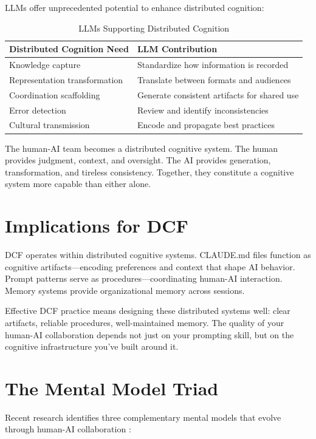 LLMs offer unprecedented potential to enhance distributed cognition:

\begin{table}[H]
\centering
\begin{tabular}{ll}
\toprule
\textbf{Distributed Cognition Need} & \textbf{LLM Contribution} \\
\midrule
Knowledge capture & Standardize how information is recorded \\
Representation transformation & Translate between formats and audiences \\
Coordination scaffolding & Generate consistent artifacts for shared use \\
Error detection & Review and identify inconsistencies \\
Cultural transmission & Encode and propagate best practices \\
\bottomrule
\end{tabular}
\caption{LLMs Supporting Distributed Cognition}
\end{table}

The human-AI team becomes a distributed cognitive system. The human provides judgment, context, and oversight. The AI provides generation, transformation, and tireless consistency. Together, they constitute a cognitive system more capable than either alone.

\section{Implications for DCF}

DCF operates within distributed cognitive systems. CLAUDE.md files function as cognitive artifacts---encoding preferences and context that shape AI behavior. Prompt patterns serve as procedures---coordinating human-AI interaction. Memory systems provide organizational memory across sessions.

Effective DCF practice means designing these distributed systems well: clear artifacts, reliable procedures, well-maintained memory. The quality of your human-AI collaboration depends not just on your prompting skill, but on the cognitive infrastructure you've built around it.

\section{The Mental Model Triad}

Recent research identifies three complementary mental models that evolve through human-AI collaboration \cite{mentalmodels2025}:

